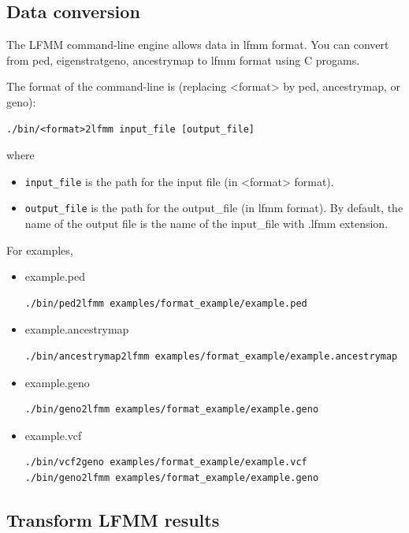 \documentclass[10pt,a4paper]{article}
\begin{document}
\subsection{Data conversion}

The LFMM command-line engine allows data in lfmm format. You can convert from ped, eigenstratgeno,
ancestrymap to lfmm format using C progams. 

The format of the command-line is (replacing <format> by ped, ancestrymap, or geno):
\begin{Verbatim}[frame=single]
./bin/<format>2lfmm input_file [output_file] 
\end{Verbatim}
where
\begin{itemize}
\item \verb|input_file| is the path for the input file (in <format> format).
\item \verb|output_file| is the path for the output\_file (in lfmm format).
By default, the name of the output file is the name of the input\_file with .lfmm extension.
\end{itemize}

\noindent
For examples,
\begin{itemize}
\item example.ped
\begin{Verbatim}[frame=single]
./bin/ped2lfmm examples/format_example/example.ped
\end{Verbatim}
\item example.ancestrymap
\begin{Verbatim}[frame=single]
./bin/ancestrymap2lfmm examples/format_example/example.ancestrymap
\end{Verbatim}
\item example.geno
\begin{Verbatim}[frame=single]
./bin/geno2lfmm examples/format_example/example.geno
\end{Verbatim}
\item example.vcf
\begin{Verbatim}[frame=single]
./bin/vcf2geno examples/format_example/example.vcf
./bin/geno2lfmm examples/format_example/example.geno
\end{Verbatim}
\end{itemize}

\subsection{Transform LFMM results}
\end{document}
